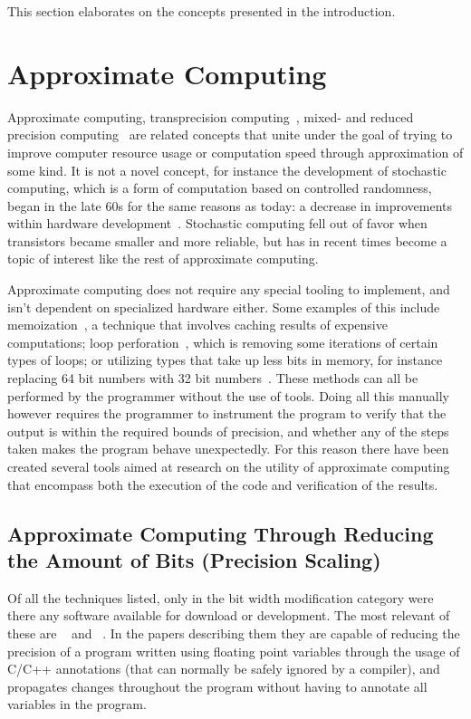 
This section elaborates on the concepts presented in the introduction.

\section{Approximate Computing}
Approximate computing, transprecision computing~\citep{malossi2018transprecision}, mixed- and reduced precision computing~\citep{cherubin2019taffo} are related concepts that unite under the goal of trying to improve computer resource usage or computation speed through approximation of some kind. It is not a novel concept, for instance the development of stochastic computing, which is a form of computation based on controlled randomness, began in the late 60s for the same reasons as today: a decrease in improvements within hardware development~\citep{sym16121701}. Stochastic computing fell out of favor when transistors became smaller and more reliable, but has in recent times become a topic of interest like the rest of approximate computing. 

Approximate computing does not require any special tooling to implement, and isn't dependent on specialized hardware either. Some examples of this include memoization~\citep{mittal2016survey}, a technique that involves caching results of expensive computations;  loop perforation~\citep{li2018sculptor}, which is removing some iterations of certain types of loops; or utilizing types that take up less bits in memory, for instance replacing 64 bit numbers with 32 bit numbers~\citep{cherubin2019taffo, tagliavini2018flexfloat, floatsmith_paper}. These methods can all be performed by the programmer without the use of tools. Doing all this manually however requires the programmer to instrument the program to verify that the output is within the required bounds of precision, and whether any of the steps taken makes the program behave unexpectedly. For this reason there have been created several tools aimed at research on the utility of approximate computing that encompass both the execution of the code and verification of the results. 

\subsection{Approximate Computing Through Reducing the Amount of Bits (Precision Scaling)}
\label{section:approximate_computing_through_reducing_bits}

Of all the techniques listed, only in the bit width modification category were there any software available for download or development. The most relevant of these are \floatsmith{}~\citep{floatsmith_paper} and \taffo{}~\citep{cherubin2019taffo}. In the papers describing them they are capable of reducing the precision of a program written using floating point variables through the usage of C/C++ annotations (that can normally be safely ignored by a compiler), and propagates changes throughout the program without having to annotate all variables in the program.

